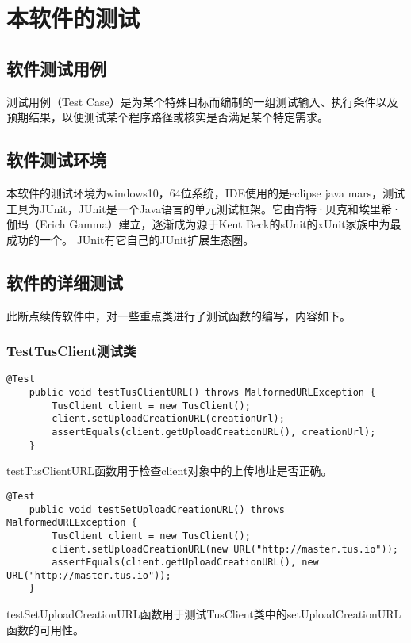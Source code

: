 \documentclass[bachelor]{thesis-uestc}
\begin{document}
\section{本软件的测试}
\subsection{软件测试用例}
测试用例（Test Case）是为某个特殊目标而编制的一组测试输入、执行条件以及预期结果，以便测试某个程序路径或核实是否满足某个特定需求。
\subsection{软件测试环境}
本软件的测试环境为windows10，64位系统，IDE使用的是eclipse java mars，测试工具为JUnit，JUnit是一个Java语言的单元测试框架。它由肯特·贝克和埃里希·伽玛（Erich Gamma）建立，逐渐成为源于Kent Beck的sUnit的xUnit家族中为最成功的一个。 JUnit有它自己的JUnit扩展生态圈。
\subsection{软件的详细测试}
此断点续传软件中，对一些重点类进行了测试函数的编写，内容如下。
\subsubsection{TestTusClient测试类}
\begin{lstlisting}[title=testTusClientURL测试函数]
    @Test
    public void testTusClientURL() throws MalformedURLException {
        TusClient client = new TusClient();
        client.setUploadCreationURL(creationUrl);
        assertEquals(client.getUploadCreationURL(), creationUrl);
    }
\end{lstlisting}
\par testTusClientURL函数用于检查client对象中的上传地址是否正确。

\begin{lstlisting}[title=testSetUploadCreationURL测试函数]
    @Test
    public void testSetUploadCreationURL() throws MalformedURLException {
        TusClient client = new TusClient();
        client.setUploadCreationURL(new URL("http://master.tus.io"));
        assertEquals(client.getUploadCreationURL(), new URL("http://master.tus.io"));
    }
\end{lstlisting}
\par testSetUploadCreationURL函数用于测试TusClient类中的setUploadCreationURL函数的可用性。
\end{document}
